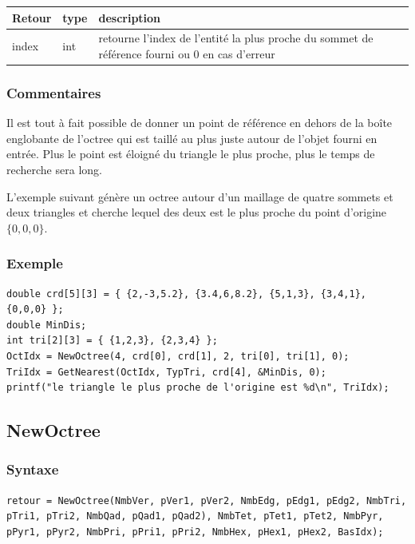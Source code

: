 \documentclass[a4paper,12pt]{article}
\begin{document}
\medskip

\begin{tabular}{|m{3cm}|m{2cm}|m{8.5cm}|}
\hline
Retour     & type   & description \\
\hline
index      & int    & retourne l'index de l'entité la plus proche du sommet de référence fourni ou 0 en cas d'erreur \\
\hline
\end{tabular}
\subsubsection*{Commentaires}
Il est tout à fait possible de donner un point de référence en dehors de la boîte englobante de l'octree qui est taillé au plus juste autour de l'objet fourni en entrée. Plus le point est éloigné du triangle le plus proche, plus le temps de recherche sera long.

L'exemple suivant génère un octree autour d'un maillage de quatre sommets et deux triangles et cherche lequel des deux est le plus proche du point d'origine $\{0,0,0\}$.

\subsubsection*{Exemple}

\begin{tt}
\begin{verbatim}
double crd[5][3] = { {2,-3,5.2}, {3.4,6,8.2}, {5,1,3}, {3,4,1}, {0,0,0} };
double MinDis;
int tri[2][3] = { {1,2,3}, {2,3,4} };
OctIdx = NewOctree(4, crd[0], crd[1], 2, tri[0], tri[1], 0);
TriIdx = GetNearest(OctIdx, TypTri, crd[4], &MinDis, 0);
printf("le triangle le plus proche de l'origine est %d\n", TriIdx);
\end{verbatim}
\end{tt}
\normalfont



\subsection{NewOctree}
\subsubsection*{Syntaxe}
{\tt retour = NewOctree(NmbVer, pVer1, pVer2,
                        NmbEdg, pEdg1, pEdg2,
                        NmbTri, pTri1, pTri2,
                        NmbQad, pQad1, pQad2),
                        NmbTet, pTet1, pTet2,
                        NmbPyr, pPyr1, pPyr2,
                        NmbPri, pPri1, pPri2,
                        NmbHex, pHex1, pHex2,
                        BasIdx);}
\end{document}
